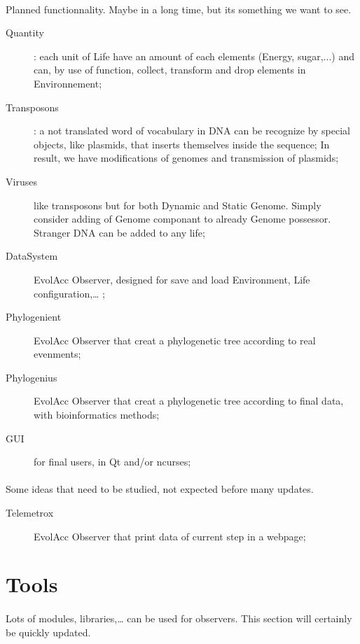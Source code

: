 \documentclass{report} %
\begin{document}
    \paragraph*{}
    Planned functionnality. Maybe in a long time, but its something we want to see.
    \begin{description}
            \item[Quantity]: each unit of Life have an amount of each elements (Energy, sugar,...) and can, by use of function, collect, transform and drop elements in Environnement; 
            \item[Transposons]: a not translated word of vocabulary in DNA can be recognize by special objects, like plasmids, that inserts themselves inside the sequence;
                    In result, we have modifications of genomes and transmission of plasmids;
            \item[Viruses] like transposons but for both Dynamic and Static Genome. Simply consider adding of Genome componant to already Genome possessor. Stranger DNA can be added to any life;
            \item[DataSystem] EvolAcc Observer, designed for save and load Environment, Life configuration,… ;
            \item[Phylogenient] EvolAcc Observer that creat a phylogenetic tree according to real evenments;
            \item[Phylogenius] EvolAcc Observer that creat a phylogenetic tree according to final data, with bioinformatics methods;
            \item[GUI] for final users, in Qt and/or ncurses;
    \end{description}

    \paragraph*{}
    Some ideas that need to be studied, not expected before many updates.
    \begin{description}
            \item[Telemetrox] EvolAcc Observer that print data of current step in a webpage; 
    \end{description}




\section*{Tools}
    \paragraph*{}
    Lots of modules, libraries,… can be used for observers.
    This section will certainly be quickly updated.
    
\end{document}
